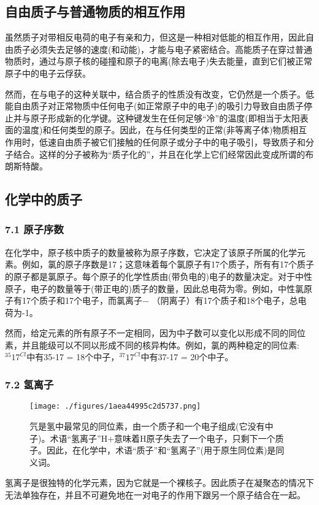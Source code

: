 \subsection{自由质子与普通物质的相互作用}
虽然质子对带相反电荷的电子有亲和力，但这是一种相对低能的相互作用，因此自由质子必须失去足够的速度(和动能)，才能与电子紧密结合。高能质子在穿过普通物质时，通过与原子核的碰撞和原子的电离(除去电子)失去能量，直到它们被正常原子中的电子云俘获。

然而，在与电子的这种关联中，结合质子的性质没有改变，它仍然是一个质子。低能自由质子对正常物质中任何电子(如正常原子中的电子)的吸引力导致自由质子停止并与原子形成新的化学键。这种键发生在任何足够“冷”的温度(即相当于太阳表面的温度)和任何类型的原子。因此，在与任何类型的正常(非等离子体)物质相互作用时，低速自由质子被它们接触的任何原子或分子中的电子吸引，导致质子和分子结合。这样的分子被称为“质子化的”，并且在化学上它们经常因此变成所谓的布朗斯特酸。

\subsection{化学中的质子}
\subsubsection{7.1 原子序数}
在化学中，原子核中质子的数量被称为原子序数，它决定了该原子所属的化学元素。例如，氯的原子序数是17；这意味着每个氯原子有17个质子，所有有17个质子的原子都是氯原子。每个原子的化学性质由(带负电的)电子的数量决定。对于中性原子，电子的数量等于(带正电的)质子的数量，因此总电荷为零。例如，中性氯原子有17个质子和17个电子，而氯离子− （阴离子）有17个质子和18个电子，总电荷为-1。

然而，给定元素的所有原子不一定相同，因为中子数可以变化以形成不同的同位素，并且能级可以不同以形成不同的核异构体。例如，氯的两种稳定的同位素:$^{35}17^{Cl}$中有35-17 = 18个中子，$^{37}17^{Cl}$中有37-17 = 20个中子。

\subsubsection{7.2 氢离子}
\begin{figure}[ht]
\centering
\texttt{[image: ./figures/1aea44995c2d5737.png]}
\caption{氕是氢中最常见的同位素，由一个质子和一个电子组成(它没有中子)。术语“氢离子”H+意味着H原子失去了一个电子，只剩下一个质子。因此，在化学中，术语“质子”和“氢离子”(用于原生同位素)是同义词。} \label{fig_Proton_6}
\end{figure}
氢离子是很独特的化学元素，因为它就是一个裸核子。因此质子在凝聚态的情况下无法单独存在，并且不可避免地在一对电子的作用下跟另一个原子结合在一起。

